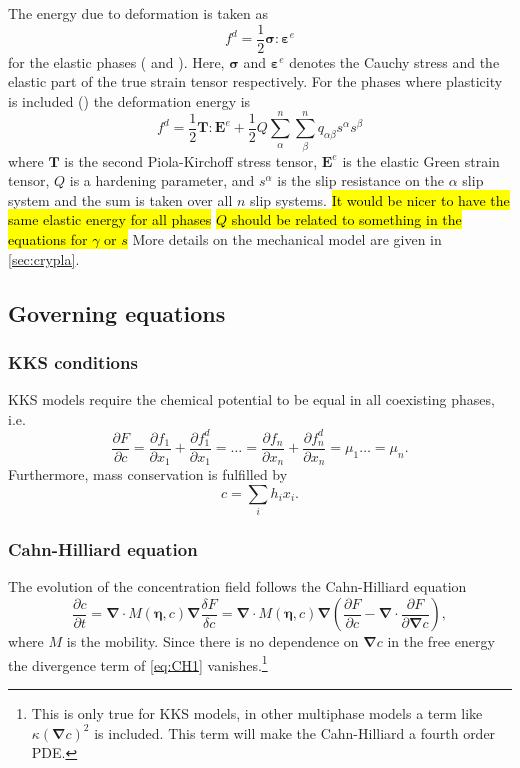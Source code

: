 \documentclass[12pt,a4paper]{article}
\newcommand{\vardiff}[2]{\frac{\delta#1}{\delta#2}}
\newcommand{\partdiff}[2]{\frac{\partial#1}{\partial#2}}
\providecommand{\vbf}[1]{\boldsymbol{#1}}
\providecommand{\gradient}[0]{\vbf{\nabla}}
\begin{document}
The energy due to deformation is taken as 
\begin{equation}
  f^d = \frac{1}{2}\vbf{\sigma}:\vbf{\varepsilon}^e
\end{equation}
for the elastic phases ( and ).
Here, $\vbf{\sigma}$ and $\vbf{\varepsilon}^e$ denotes the Cauchy stress and the elastic part of the true strain tensor respectively.
For the phases where plasticity is included () the deformation energy is
\begin{equation}
  f^d = \frac{1}{2}\vbf{T}:\vbf{E}^e+\frac{1}{2}Q\sum_\alpha^n\sum_\beta^n q_{\alpha\beta}s^\alpha s^\beta
\end{equation}
where $\vbf{T}$ is the second Piola-Kirchoff stress tensor, $\vbf{E}^e$ is the elastic Green strain tensor, $Q$ is a hardening parameter, and $s^\alpha$ is the slip resistance on the $\alpha$ slip system and the sum is taken over all $n$ slip systems. \hl{It would be nicer to have the same elastic energy for all phases} \hl{$Q$ should be related to something in the equations for $\gamma$ or $s$}
More details on the mechanical model are given in \cref{sec:crypla}.

\subsection{Governing equations}
\subsubsection{KKS conditions}
KKS models require the chemical potential to be equal in all coexisting phases, i.e.
\begin{equation}
  \partdiff{F}{c}=\partdiff{f_1}{x_1}+\partdiff{f^d_1}{x_1}=\dots=\partdiff{f_n}{x_n}+\partdiff{f^d_n}{x_n}=\mu_1\dots=\mu_n.
  \label{eq:KKS}
\end{equation}
Furthermore, mass conservation is fulfilled by
\begin{equation}
  c=\sum_ih_ix_i.
  \label{eq:mass}
\end{equation}
\subsubsection{Cahn-Hilliard equation}
The evolution of the concentration field follows the Cahn-Hilliard equation
\begin{equation}
  \partdiff{c}{t}=\gradient\cdot M(\vbf{\eta},c)\gradient \vardiff{F}{c}=\gradient\cdot M(\vbf{\eta},c)\gradient\left(\partdiff{F}{c}-\gradient\cdot\partdiff{F}{\gradient c}\right),
  \label{eq:CH1}
\end{equation}
where $M$ is the mobility.
Since there is no dependence on $\gradient c$ in the free energy the divergence term of \cref{eq:CH1} vanishes.\footnote{This is only true for KKS models, in other multiphase models a term like $\kappa\left(\gradient c\right)^2$ is included.
This term will make the Cahn-Hilliard a fourth order PDE.}
\end{document}
